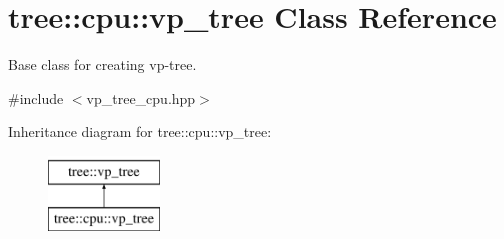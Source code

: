 \hypertarget{classtree_1_1cpu_1_1vp__tree}{}\section{tree\+:\+:cpu\+:\+:vp\+\_\+tree Class Reference}
\label{classtree_1_1cpu_1_1vp__tree}


Base class for creating vp-\/tree.  




{\ttfamily \#include $<$vp\+\_\+tree\+\_\+cpu.\+hpp$>$}

Inheritance diagram for tree\+:\+:cpu\+:\+:vp\+\_\+tree\+:\begin{figure}[H]
\begin{center}
\leavevmode
\includegraphics[height=2.000000cm]{classtree_1_1cpu_1_1vp__tree}
\end{center}
\end{figure}
